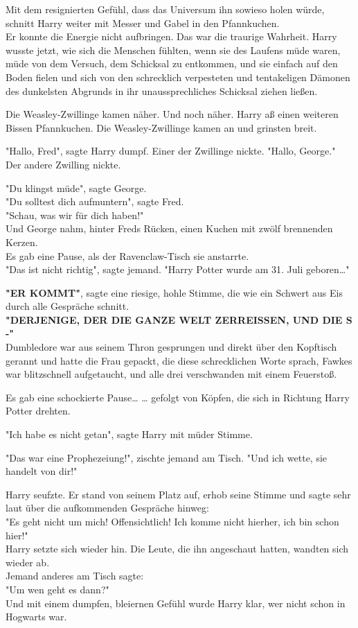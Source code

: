 {Mit dem resignierten Gefühl, dass das Universum ihn sowieso holen würde, schnitt Harry weiter mit Messer und Gabel in den Pfannkuchen.\\ Er konnte die Energie nicht aufbringen. Das war die traurige Wahrheit. Harry wusste jetzt, wie sich die Menschen fühlten, wenn sie des Laufens müde waren, müde von dem Versuch, dem Schicksal zu entkommen, und sie einfach auf den Boden fielen und sich von den schrecklich verpesteten und tentakeligen Dämonen des dunkelsten Abgrunds in ihr unaussprechliches Schicksal ziehen ließen.

Die Weasley-Zwillinge kamen näher. Und noch näher. Harry aß einen weiteren Bissen Pfannkuchen. Die Weasley-Zwillinge kamen an und grinsten breit.

"Hallo, Fred", sagte Harry dumpf. Einer der Zwillinge nickte. "Hallo, George."\\ Der andere Zwilling nickte.

"Du klingst müde", sagte George.\\ "Du solltest dich aufmuntern", sagte Fred.\\ "Schau, was wir für dich haben!"\\ Und George nahm, hinter Freds Rücken, einen Kuchen mit zwölf brennenden Kerzen.\\ Es gab eine Pause, als der Ravenclaw-Tisch sie anstarrte.\\ "Das ist nicht richtig", sagte jemand. "Harry Potter wurde am 31. Juli geboren…"

\textbf{"ER KOMMT"}, sagte eine riesige, hohle Stimme, die wie ein Schwert aus Eis durch alle Gespräche schnitt.\\ \textbf{"DERJENIGE, DER DIE GANZE WELT ZERREISSEN, UND DIE S -"}\\ Dumbledore war aus seinem Thron gesprungen und direkt über den Kopftisch gerannt und hatte die Frau gepackt, die diese schrecklichen Worte sprach, Fawkes war blitzschnell aufgetaucht, und alle drei verschwanden mit einem Feuerstoß.

Es gab eine schockierte Pause… … gefolgt von Köpfen, die sich in Richtung Harry Potter drehten.

"Ich habe es nicht getan", sagte Harry mit müder Stimme.

"Das war eine Prophezeiung!", zischte jemand am Tisch. "Und ich wette, sie handelt von dir!"

Harry seufzte. Er stand von seinem Platz auf, erhob seine Stimme und sagte sehr laut über die aufkommenden Gespräche hinweg:\\ "Es geht nicht um mich! Offensichtlich! Ich komme nicht hierher, ich bin schon hier!"\\ Harry setzte sich wieder hin. Die Leute, die ihn angeschaut hatten, wandten sich wieder ab.\\ Jemand anderes am Tisch sagte:\\ "Um wen geht es dann?"\\ Und mit einem dumpfen, bleiernen Gefühl wurde Harry klar, wer nicht schon in Hogwarts war.

}
